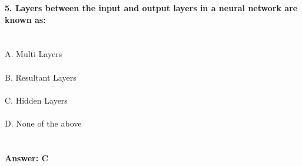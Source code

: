 \documentclass[prl,twocolumn,showpacs,preprintnumbers,superscriptaddress]{revtex4}
\theoremstyle{plain}
\theoremstyle{definition}
\begin{document}
\begin{widetext}
\textbf{5. Layers between the input and output layers in a neural network are known as:}
\\
\\
\\
A. Multi Layers
\\
\\
B. Resultant Layers
\\
\\
C. Hidden Layers
\\
\\
D. None of the above
\\
\\
\\
\textbf{Answer: C}
\\
\\
\\
\end{widetext}
\end{document}

